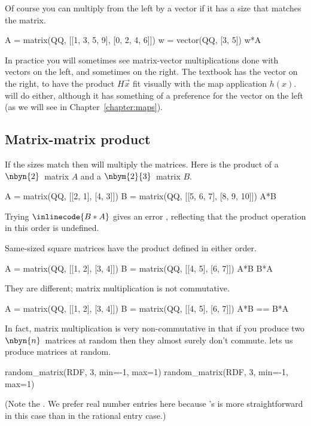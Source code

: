 Of course you can multiply from the left by a vector if it has a size that 
matches the matrix.
\begin{sageoutput}[d,0,1]
A = matrix(QQ, [[1, 3, 5, 9], [0, 2, 4, 6]])
w = vector(QQ, [3, 5])
w*A
\end{sageoutput}
\noindent
In practice you will sometimes 
see matrix-vector multiplications done with vectors
on the left, and sometimes on the right.
The textbook has the vector on the right, 
to have the product
$H\vec{x}$ fit visually with the map application $h(x)$.
\Sage{} will do either, although it has something of a preference
for the vector on the left (as we will see in Chapter~\ref{chapter:maps}).



\subsection{Matrix-matrix product}
If the sizes match then \Sage{} will multiply the matrices.
Here is the product of a $\nbyn{2}$~matrix $A$ and a $\nbym{2}{3}$~matrix $B$.
\begin{sageoutput}
A = matrix(QQ, [[2, 1], [4, 3]])
B = matrix(QQ, [[5, 6, 7], [8, 9, 10]]) 
A*B
\end{sageoutput}
Trying $\inlinecode{B*A}$ gives an error 
, reflecting that
the product operation in this order is undefined.

Same-sized square matrices have the product defined in either order.
\begin{sageoutput}
A = matrix(QQ, [[1, 2], [3, 4]])
B = matrix(QQ, [[4, 5], [6, 7]])
A*B
B*A
\end{sageoutput}
\noindent
They are different; matrix multiplication is not commutative.
\begin{sageoutput}[d,0,2]
A = matrix(QQ, [[1, 2], [3, 4]])
B = matrix(QQ, [[4, 5], [6, 7]])
A*B == B*A
\end{sageoutput}

In fact, matrix multiplication is very non-commutative 
in that if you produce two $\nbyn{n}$~matrices
at random then they almost surely don't commute.
\Sage{} lets us produce matrices at random.
\begin{sageoutput}
random_matrix(RDF, 3, min=-1, max=1)
random_matrix(RDF, 3, min=-1, max=1)
\end{sageoutput}
\noindent  
(Note the .
We prefer real number entries here because
\Sage's  
is more straightforward in this case than in the  
rational entry case.)

